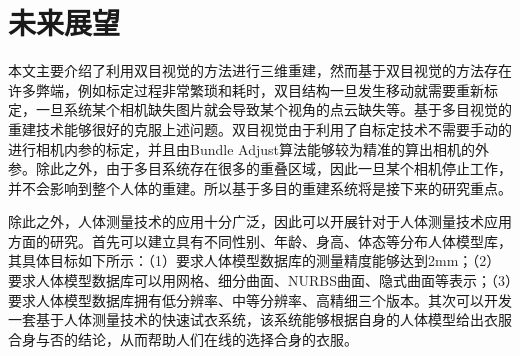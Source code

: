 \documentclass[10pt]{article}
\begin{document}
\section{未来展望}
本文主要介绍了利用双目视觉的方法进行三维重建，然而基于双目视觉的方法存在许多弊端，例如标定过程非常繁琐和耗时，双目结构一旦发生移动就需要重新标定，一旦系统某个相机缺失图片就会导致某个视角的点云缺失等。基于多目视觉的重建技术能够很好的克服上述问题。双目视觉由于利用了自标定技术不需要手动的进行相机内参的标定，并且由Bundle Adjust算法能够较为精准的算出相机的外参。除此之外，由于多目系统存在很多的重叠区域，因此一旦某个相机停止工作，并不会影响到整个人体的重建。所以基于多目的重建系统将是接下来的研究重点。
\par 除此之外，人体测量技术的应用十分广泛，因此可以开展针对于人体测量技术应用方面的研究。首先可以建立具有不同性别、年龄、身高、体态等分布人体模型库，其具体目标如下所示：（1）要求人体模型数据库的测量精度能够达到2mm；（2）要求人体模型数据库可以用网格、细分曲面、NURBS曲面、隐式曲面等表示；（3）要求人体模型数据库拥有低分辨率、中等分辨率、高精细三个版本。其次可以开发一套基于人体测量技术的快速试衣系统，该系统能够根据自身的人体模型给出衣服合身与否的结论，从而帮助人们在线的选择合身的衣服。
\end{document}
